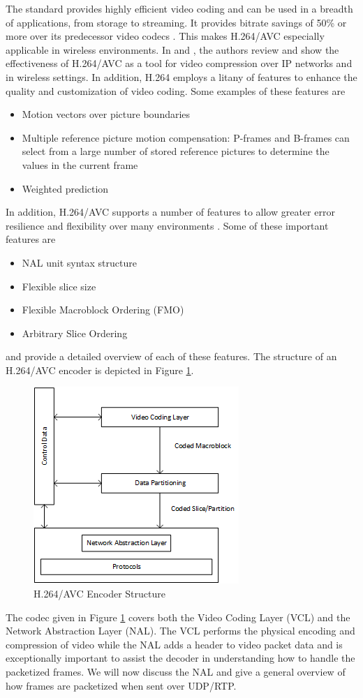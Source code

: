 \documentclass[a4paper,12pt]{article}
\begin{document}
The standard provides highly efficient video coding and can be used in a breadth of applications, from storage to streaming. It provides bitrate savings of 50\% or more over its predecessor video codecs \cite{RTP}. This makes H.264/AVC especially applicable in wireless environments. In \cite{H264OverIP} and \cite{WirelessH264}, the authors review and show the effectiveness of H.264/AVC as a tool for video compression over IP networks and in wireless settings. In addition, H.264 employs a litany of features to enhance the quality and customization of video coding. Some examples of these features are 
\begin{itemize}
	\item Motion vectors over picture boundaries
	\item Multiple reference picture motion compensation: P-frames and B-frames can select from a large number of stored reference pictures to determine the values in the current frame \cite{H264AVCOverview}
	\item Weighted prediction
\end{itemize}
In addition, H.264/AVC supports a number of features to allow greater error resilience and flexibility over many environments \cite{H264AVCOverview}. Some of these important features are
\begin{itemize}
	\item NAL unit syntax structure
	\item Flexible slice size
	\item Flexible Macroblock Ordering (FMO)
	\item Arbitrary Slice Ordering
\end{itemize}
 \cite{H264AVCOverview} and \cite{H264Spec} provide a detailed overview of each of these features. The structure of an H.264/AVC encoder is depicted in Figure \ref{fig:H264EncoderStructure}.
\begin{figure}[h]
\centering
\includegraphics[width=0.4\linewidth]{H264AVCEncoderStructure.png}
\caption{H.264/AVC Encoder Structure \cite{H264AVCOverview}}
\label{fig:H264EncoderStructure}
\end{figure}
The codec given in Figure \ref{fig:H264EncoderStructure} covers both the Video Coding Layer (VCL) and the Network Abstraction Layer (NAL). The VCL performs the physical encoding and compression of video while the NAL adds a header to video packet data and is exceptionally important to assist the decoder in understanding how to handle the packetized frames. We will now discuss the NAL and give a general overview of how frames are packetized when sent over UDP/RTP. 
\end{document}
